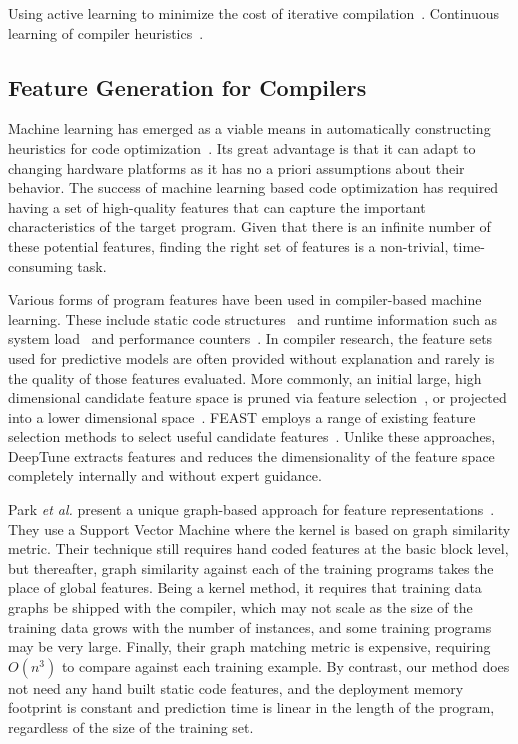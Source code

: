 Using active learning to minimize the cost of iterative compilation~\cite{Ogilvie2017}.
Continuous learning of compiler heuristics~\cite{Tartara2013,Fursin2011}.

\subsection{Feature Generation for Compilers}

Machine learning has emerged as a viable means in automatically constructing heuristics for code optimization~\cite{Stephenson2005,Agakov,Wang2010,Kulkarni2012,Ding2015,Muralidharan2016}. Its great advantage is that it can adapt to changing hardware platforms as it has no a priori assumptions about their behavior. The success of machine learning based code optimization has required having a set of high-quality features that can capture the important characteristics of the target program. Given that there is an infinite number of these potential features, finding the right set of features is a non-trivial, time-consuming task.

Various forms of program features have been used in compiler-based machine learning. These include static code structures~\cite{Jiang2010} and runtime information such as system load~\cite{Wen2015} and performance counters~\cite{Dubach2009}. In compiler research, the feature sets used for predictive models are often provided without explanation and rarely is the quality of those features evaluated. More commonly, an initial large, high dimensional candidate feature space is pruned via feature selection~\cite{Stephenson2005}, or projected into a lower dimensional space~\cite{Collins2013,Dubach2007}. FEAST employs a range of existing feature selection methods to select useful candidate features~\cite{Ting2016}. Unlike these approaches, DeepTune extracts features and reduces the dimensionality of the feature space completely internally and without expert guidance.

Park \emph{et al.} present a unique graph-based approach for feature representations~\cite{Park2012}. They use a Support Vector Machine where the kernel is based on graph similarity metric. Their technique still requires hand coded features at the basic block level, but thereafter, graph similarity against each of the training programs takes the place of global features. Being a kernel method, it requires that training data graphs be shipped with the compiler, which may not scale as the size of the training data grows with the number of instances, and some training programs may be very large. Finally, their graph matching metric is expensive, requiring $O(n^3)$ to compare against each training example. By contrast, our method does not need any hand built static code features, and the deployment memory footprint is constant and prediction time is linear in the length of the program, regardless of the size of the training set.


